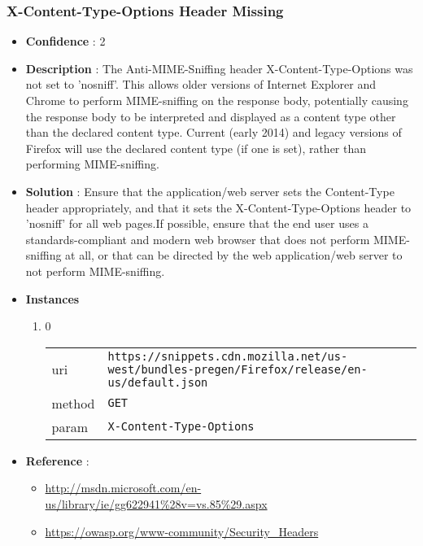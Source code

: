 \documentclass[10pt]{article}
\begin{document}
\subsubsection{X-Content-Type-Options Header Missing}
\begin{itemize}
\item[] \textbf{Confidence} : 2
\item[] \textbf{Description} : The Anti-MIME-Sniffing header X-Content-Type-Options was not set to 'nosniff'. This allows older versions of Internet Explorer and Chrome to perform MIME-sniffing on the response body, potentially causing the response body to be interpreted and displayed as a content type other than the declared content type. Current (early 2014) and legacy versions of Firefox will use the declared content type (if one is set), rather than performing MIME-sniffing.
\item[] \textbf{Solution} :  Ensure that the application/web server sets the Content-Type header appropriately, and that it sets the X-Content-Type-Options header to 'nosniff' for all web pages.If possible, ensure that the end user uses a standards-compliant and modern web browser that does not perform MIME-sniffing at all, or that can be directed by the web application/web server to not perform MIME-sniffing.
\item[] \textbf{Instances}
\begin{enumerate}
\item[] 0
\begin{tabular}{| l | p{12cm}}
uri & \texttt{https://snippets.cdn.mozilla.net/us-west/bundles-pregen/Firefox/release/en-us/default.json} \\
method & \texttt{GET} \\
param & \texttt{X-Content-Type-Options} \\
\end{tabular}
\end{enumerate}
\item[] \textbf{Reference} : 
\begin{itemize}
\item \url{http://msdn.microsoft.com/en-us/library/ie/gg622941\%28v=vs.85\%29.aspx}
\item \url{https://owasp.org/www-community/Security\_Headers}
\end{itemize}
\end{itemize}
\end{document}
